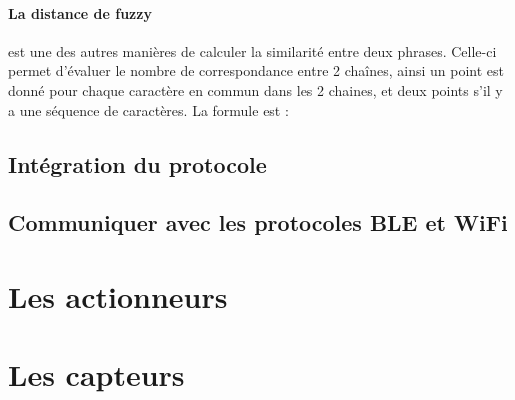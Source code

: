 \paragraph{La distance de fuzzy}est une des autres manières de calculer la similarité entre deux phrases. 
Celle-ci permet d'évaluer le nombre de correspondance entre 2 chaînes, ainsi un point est donné pour chaque 
caractère en commun dans les 2 chaines, et deux points s'il y a une séquence de caractères. La formule est : 

	\subsection{Intégration du protocole}

	\subsection{Communiquer avec les protocoles BLE et WiFi}
\section{Les actionneurs}
\section{Les capteurs}


